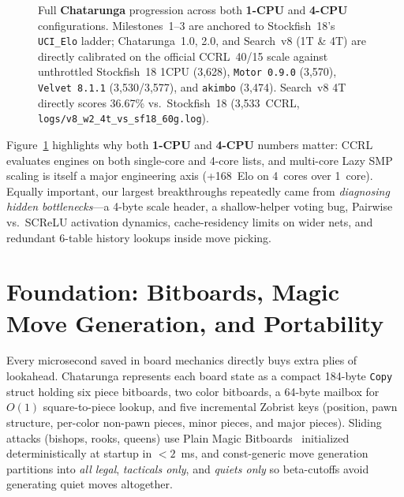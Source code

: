 \documentclass[10.5pt,letterpaper]{article}
\begin{document}
\begin{figure}[H]
\caption{Full \textbf{Chatarunga} progression across both \textbf{1-CPU} and \textbf{4-CPU} configurations. Milestones~1--3 are anchored to Stockfish~18's \texttt{UCI\_Elo} ladder; Chatarunga~1.0, 2.0, and Search~v8 (1T \& 4T) are directly calibrated on the official CCRL~40/15 scale against unthrottled Stockfish~18 1CPU (3,628), \texttt{Motor 0.9.0} (3,570), \texttt{Velvet 8.1.1} (3,530/3,577), and \texttt{akimbo} (3,474). Search~v8 4T directly scores 36.67\% vs.\ Stockfish~18 (3,533~CCRL, \texttt{logs/v8\_w2\_4t\_vs\_sf18\_60g.log}).}
\label{fig:climb}
\end{figure}

Figure~\ref{fig:climb} highlights why both \textbf{1-CPU} and \textbf{4-CPU} numbers matter: CCRL evaluates engines on both single-core and 4-core lists, and multi-core Lazy SMP scaling is itself a major engineering axis (+168~Elo on 4~cores over 1~core). Equally important, our largest breakthroughs repeatedly came from \emph{diagnosing hidden bottlenecks}---a 4-byte scale header, a shallow-helper voting bug, Pairwise vs.\ SCReLU activation dynamics, cache-residency limits on wider nets, and redundant 6-table history lookups inside move picking.

\section{Foundation: Bitboards, Magic Move Generation, and Portability}

Every microsecond saved in board mechanics directly buys extra plies of lookahead. Chatarunga represents each board state as a compact 184-byte \texttt{Copy} struct holding six piece bitboards, two color bitboards, a 64-byte mailbox for $O(1)$ square-to-piece lookup, and five incremental Zobrist keys (position, pawn structure, per-color non-pawn pieces, minor pieces, and major pieces). Sliding attacks (bishops, rooks, queens) use Plain Magic Bitboards~\cite{magicbitboards} initialized deterministically at startup in $<2$~ms, and const-generic move generation partitions into \emph{all legal}, \emph{tacticals only}, and \emph{quiets only} so beta-cutoffs avoid generating quiet moves altogether.
\end{document}
